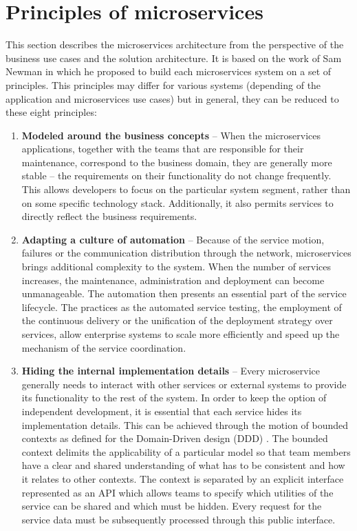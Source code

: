 \documentclass[oneside,
  digital, %
  table,   %
  lof,     %
  lot,     %
]{fithesis3}
\begin{document}
\section{Principles of microservices}

This section describes the microservices architecture from the perspective of the business use cases and the solution architecture. It is based on the work of Sam Newman \cite{building_ms, principles_of_microservices} in which he proposed to build each microservices system on a set of principles. This principles may differ for various systems (depending of the application and microservices use cases) but in general, they can be reduced to these eight principles:

\begin{enumerate}
	
	\item \textbf{Modeled around the business concepts} -- When the  microservices applications, together with the teams that are responsible for their maintenance, correspond to the business domain, they are generally more stable -- the requirements on their functionality do not change frequently. This allows developers to focus on the particular system segment, rather than on some specific technology stack. Additionally, it also permits services to directly reflect the business requirements.
	
	\item \textbf{Adapting a culture of automation} -- Because of the  service motion, failures or the communication distribution through the network, microservices brings additional complexity to the system. When the number of services increases, the maintenance, administration and deployment can become unmanageable. The automation then presents an essential part of the service lifecycle. The practices as the automated service testing, the employment of the continuous delivery or the unification of the deployment strategy over services, allow enterprise systems to scale more efficiently and speed up the mechanism of the service coordination.
	
	\item \textbf{Hiding the internal implementation details} -- Every microservice generally needs to interact with other services or external systems to provide its functionality to the rest of the system. In order to keep the option of independent development, it is essential that each service hides its implementation details. This can be achieved through the motion of bounded contexts as defined for the Domain-Driven design (DDD) \cite{ddd}. The bounded context delimits the applicability of a particular model so that team members have a clear and shared understanding of what has to be consistent and how it relates to other contexts. The context is separated by an explicit interface represented as an API which allows teams to specify which utilities of the service can be shared and which must be hidden. Every request for the service data must be subsequently processed through this public interface.
	

\end{enumerate}
\end{document}
